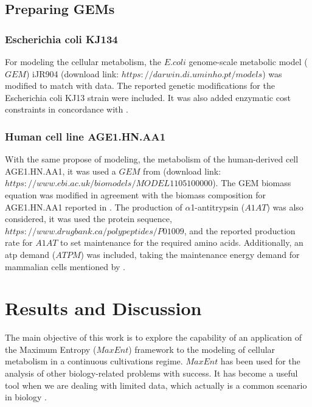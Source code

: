 \documentclass[]{article}
\begin{document}
	
	\subsection{Preparing GEMs} 
	
	\subsubsection{Escherichia coli KJ134}
	For modeling the cellular metabolism, the $E. coli$ genome-scale metabolic model ($GEM$) iJR904  (download link: $https://darwin.di.uminho.pt/models$) was modified to match with  data. The reported genetic modifications for the Escherichia coli KJ13 strain were included. It was also added enzymatic cost constraints in concordance with .
	
	
	\subsubsection{Human cell line AGE1.HN.AA1}
	With the same propose of modeling, the metabolism of the human-derived cell AGE1.HN.AA1, it was used a $GEM$ from (download link: $https://www.ebi.ac.uk/biomodels/MODEL1105100000$). The GEM biomass equation was modified in agreement with the biomass composition for AGE1.HN.AA1 reported in . The production of $\alpha$1-antitrypsin ($A1AT$) was also considered, it was used the protein sequence, $https://www.drugbank.ca/polypeptides/P01009$, and the reported production rate for $A1AT$  to set maintenance for the required amino acids. Additionally, an atp demand ($ATPM$) was included, taking the maintenance energy demand for mammalian cells mentioned by  .
		
	
	
	\newpage
	\section{Results and Discussion} 
	
	The main objective of this work is to explore the capability of an application of the Maximum Entropy ($MaxEnt$) framework to the modeling of cellular metabolism in a continuous cultivations regime. 
	$MaxEnt$ has been used for the analysis of other biology-related problems with success. 
	It has become a useful tool when we are dealing with limited data, which actually is a common scenario in biology . 
	
\end{document}
